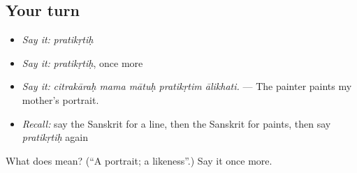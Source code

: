 \subsection*{Your turn}
\begin{itemize}
\raggedright
  \item \emph{Say it:} \emph{pratikṛtiḥ}
  \item \emph{Say it:} \emph{pratikṛtiḥ}, once more
  \item \emph{Say it:} \emph{citrakāraḥ mama mātuḥ pratikṛtim ālikhati.} — The painter paints my mother's portrait.
  \item \emph{Recall:} say the Sanskrit for a line, then the Sanskrit for paints, then say \emph{pratikṛtiḥ} again
\end{itemize}

\begin{tcolorbox}[breakable,colback=teal!4,colframe=teal!35!black,title={Before you move on}]
What does  mean? (\textquotedblleft{}A portrait; a likeness\textquotedblright{}.) Say it once more.
\end{tcolorbox}
